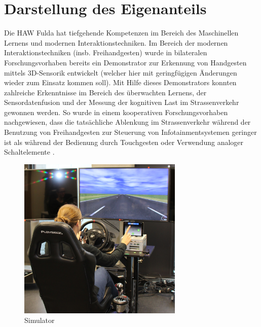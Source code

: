 \documentclass{article}
\begin{document}
\section{Darstellung des Eigenanteils}\label{sec:eigen}
Die HAW Fulda hat tiefgehende Kompetenzen im Bereich des Maschinellen Lernens und modernen Interaktionstechniken. Im Bereich der modernen Interaktionstechniken (insb. Freihandgesten) wurde in bilateralen Forschungsvorhaben bereits ein Demonstrator zur Erkennung von Handgesten mittels 3D-Sensorik entwickelt (welcher hier mit geringfügigen Änderungen wieder zum Einsatz kommen soll). Mit Hilfe dieses Demonstrators konnten zahlreiche Erkenntnisse im Bereich des überwachten Lernens, der Sensordatenfusion und der Messung der kognitiven Last im Strassenverkehr gewonnen werden. So wurde in einem kooperativen Forschungsvorhaben nachgewiesen, dass die tatsächliche Ablenkung im Strassenverkehr während der Benutzung von Freihandgesten zur Steuerung von Infotainmentsystemen geringer ist als während der Bedienung durch Touchgesten oder Verwendung analoger Schaltelemente \cite{kopinski2016touch}. 
%
\begin{figure}[ht]
	\centering
  \includegraphics[width=0.7\textwidth]{images/simulator.png}
	\caption{Simulator}
	\label{fig1}
\end{figure}
%
\end{document}

